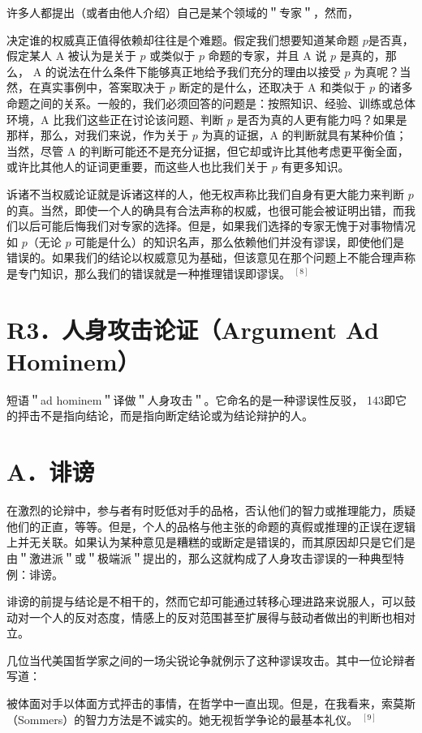 许多人都提出（或者由他人介绍）自己是某个领域的＂专家＂，然而，

决定谁的权威真正值得依赖却往往是个难题。假定我们想要知道某命题 $p$是否真，假定某人 A 被认为是关于 $p$ 或类似于 $p$ 命题的专家，并且 A 说 $p$ 是真的，那么， A 的说法在什么条件下能够真正地给予我们充分的理由以接受 $p$ 为真呢？当然，在真实事例中，答案取决于 $p$ 断定的是什么，还取决于 A 和类似于 $p$ 的诸多命题之间的关系。一般的，我们必须回答的问题是：按照知识、经验、训练或总体环境，A 比我们这些正在讨论该问题、判断 $p$ 是否为真的人更有能力吗？如果是那样，那么，对我们来说，作为关于 $p$ 为真的证据，A 的判断就具有某种价值；当然，尽管 A 的判断可能还不是充分证据，但它却或许比其他考虑更平衡全面，或许比其他人的证词更重要，而这些人也比我们关于 $p$ 有更多知识。

诉诸不当权威论证就是诉诸这样的人，他无权声称比我们自身有更大能力来判断 $p$ 的真。当然，即使一个人的确具有合法声称的权威，也很可能会被证明出错，而我们以后可能后悔我们对专家的选择。但是，如果我们选择的专家无愧于对事物情况如 $p$（无论 $p$ 可能是什么）的知识名声，那么依赖他们并没有谬误，即使他们是错误的。如果我们的结论以权威意见为基础，但该意见在那个问题上不能合理声称是专门知识，那么我们的错误就是一种推理错误即谬误。 ${ }^{[8]}$

\section*{R3．人身攻击论证（Argument Ad Hominem）}
短语＂ad hominem＂译做＂人身攻击＂。它命名的是一种谬误性反驳， 143即它的抨击不是指向结论，而是指向断定结论或为结论辩护的人。

\section*{A．诽谤}
在激烈的论辩中，参与者有时贬低对手的品格，否认他们的智力或推理能力，质疑他们的正直，等等。但是，个人的品格与他主张的命题的真假或推理的正误在逻辑上并无关联。如果认为某种意见是糟糕的或断定是错误的，而其原因却只是它们是由＂激进派＂或＂极端派＂提出的，那么这就构成了人身攻击谬误的一种典型特例：诽谤。

诽谤的前提与结论是不相干的，然而它却可能通过转移心理进路来说服人，可以鼓动对一个人的反对态度，情感上的反对范围甚至扩展得与鼓动者做出的判断也相对立。

几位当代美国哲学家之间的一场尖锐论争就例示了这种谬误攻击。其中一位论辩者写道：

被体面对手以体面方式抨击的事情，在哲学中一直出现。但是，在我看来，索莫斯（Sommers）的智力方法是不诚实的。她无视哲学争论的最基本礼仪。 ${ }^{[9]}$

